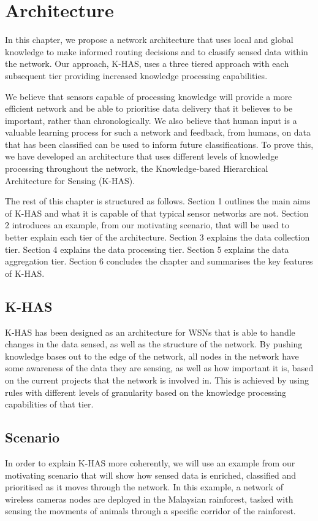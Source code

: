 \chapter{Architecture}
	In this chapter, we propose a network architecture that uses local and global knowledge to make informed routing decisions and to classify sensed data within the network. Our approach, K-HAS, uses a three tiered approach with each subsequent tier providing increased knowledge processing capabilities. 

	We believe that sensors capable of processing knowledge will provide a more efficient network and be able to prioritise data delivery that it believes to be important, rather than chronologically. We also believe that human input is a valuable learning process for such a network and feedback, from humans, on data that has been classified can be used to inform future classifications. To prove this, we have developed an architecture that uses different levels of knowledge processing throughout the network, the Knowledge-based Hierarchical Architecture for Sensing (K-HAS).

	The rest of this chapter is structured as follows. Section 1 outlines the main aims of K-HAS and what it is capable of that typical sensor networks are not. Section 2 introduces an example, from our motivating scenario, that will be used to better explain each tier of the architecture. Section 3 explains the data collection tier. Section 4 explains the data processing tier. Section 5 explains the data aggregation tier. Section 6 concludes the chapter and summarises the key features of K-HAS.

	\section{K-HAS}
		K-HAS has been designed as an architecture for WSNs that is able to handle changes in the data sensed, as well as the structure of the network. By pushing knowledge bases out to the edge of the network, all nodes in the network have some awareness of the data they are sensing, as well as how important it is, based on the current projects that the network is involved in. This is achieved by using rules with different levels of granularity based on the knowledge processing capabilities of that tier.
	
	\section{Scenario}
		In order to explain K-HAS more coherently, we will use an example from our motivating scenario that will show how sensed data is enriched, classified and prioritised as it moves through the network. In this example, a network of wireless cameras nodes are deployed in the Malaysian rainforest, tasked with sensing the movments of animals through a specific corridor of the rainforest. 


